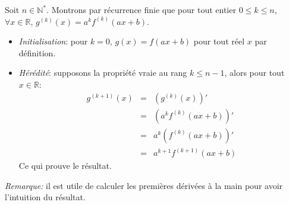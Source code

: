 Soit $n \in \mathbb{N}^*$. Montrons par récurrence finie que pour tout entier $0 \leq k \leq n$, $\forall x\in \mathbb{R}, \, g^{(k)}(x)=a^kf^{(k)}(ax+b)$.
\begin{itemize}
  \item \textit{Initialisation}: pour $k=0$, $g(x)=f(ax+b)$ pour tout réel $x$ par définition.
  \item \textit{Hérédité}: supposons la propriété vraie au rang $k \leq n-1$, alors pour tout $x \in \mathbb{R}$:
  \begin{eqnarray}
    g^{(k+1)}(x) &=& \left( g^{(k)}(x) \right)'  \nonumber \\
                &=& \left( a^kf^{(k)}(ax+b) \right)'  \nonumber \\
                &=& a^k \left( f^{(k)}(ax+b) \right)'  \nonumber \\
                &=& a^{k+1} f^{(k+1)}(ax+b)  \nonumber 
  \end{eqnarray}
  Ce qui prouve le résultat.
\end{itemize}

\textit{Remarque:} il est utile de calculer les premières dérivées à la main pour avoir l'intuition du résultat.
